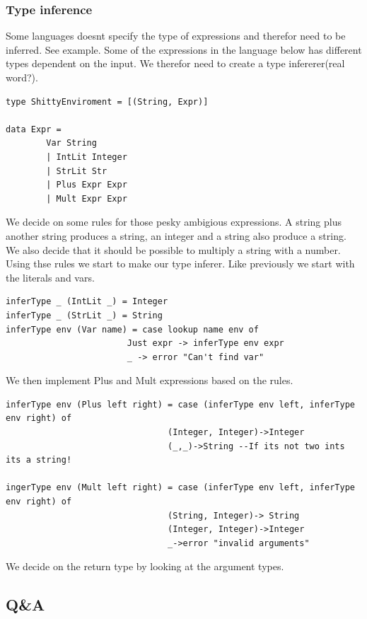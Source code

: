 \documentclass{article}
\begin{document}
            \subsubsection{Type inference}
            Some languages doesnt specify the type of expressions and therefor need to be inferred. See example.
            Some of the expressions in the language below has different types dependent on the input. We therefor need to create a type infererer(real word?).
            \begin{lstlisting}
type ShittyEnviroment = [(String, Expr)]

data Expr = 
        Var String
        | IntLit Integer
        | StrLit Str
        | Plus Expr Expr
        | Mult Expr Expr
            \end{lstlisting}
            We decide on some rules for those pesky ambigious expressions. A string plus another string produces a string, an integer and a string also produce a string.
            We also decide that it should be possible to multiply a string with a number. Using thse rules we start to make our type inferer.
            Like previously we start with the literals and vars.
            \begin{lstlisting}
inferType _ (IntLit _) = Integer
inferType _ (StrLit _) = String
inferType env (Var name) = case lookup name env of
                        Just expr -> inferType env expr
                        _ -> error "Can't find var"
            \end{lstlisting}
            We then implement Plus and Mult expressions based on the rules.
            \begin{lstlisting}
inferType env (Plus left right) = case (inferType env left, inferType env right) of
                                (Integer, Integer)->Integer
                                (_,_)->String --If its not two ints its a string!

ingerType env (Mult left right) = case (inferType env left, inferType env right) of
                                (String, Integer)-> String
                                (Integer, Integer)->Integer
                                _->error "invalid arguments"
            \end{lstlisting}
            We decide on the return type by looking at the argument types.
    \subsection{Q\&A}
\end{document}

